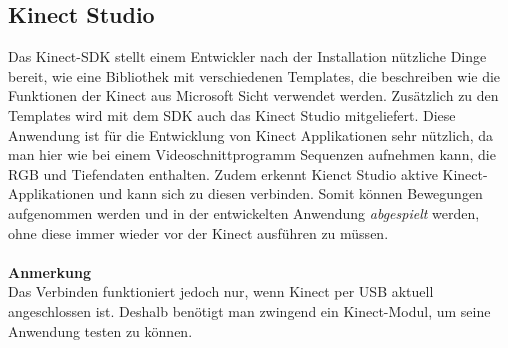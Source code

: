\subsection{Kinect Studio}
Das Kinect-SDK stellt einem Entwickler nach der Installation nützliche Dinge bereit, wie eine Bibliothek mit verschiedenen Templates, die beschreiben wie die Funktionen der Kinect aus Microsoft Sicht verwendet werden. Zusätzlich zu den Templates wird mit dem SDK auch das Kinect Studio mitgeliefert. Diese Anwendung ist für die Entwicklung von Kinect Applikationen sehr nützlich, da man hier wie bei einem Videoschnittprogramm Sequenzen aufnehmen kann, die RGB und Tiefendaten enthalten. Zudem erkennt Kienct Studio aktive Kinect-Applikationen und kann sich zu diesen verbinden. Somit können Bewegungen aufgenommen werden und in der entwickelten Anwendung \textit{abgespielt} werden, ohne diese immer wieder vor der Kinect ausführen zu müssen.
\\ \\
\textbf{Anmerkung}\\
Das Verbinden funktioniert jedoch nur, wenn Kinect per USB aktuell angeschlossen ist. Deshalb benötigt man zwingend ein Kinect-Modul, um seine Anwendung testen zu können.